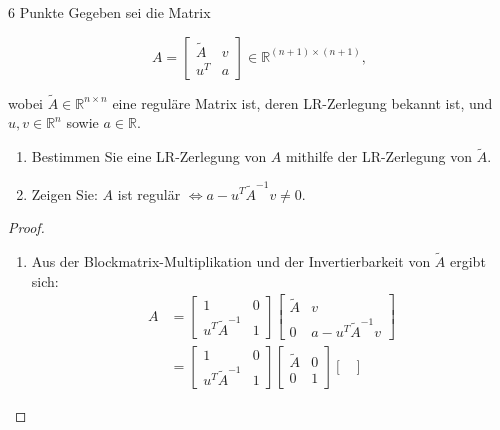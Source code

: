\documentclass{problemset}
\begin{document}
\begin{problem}{6 Punkte}
Gegeben sei die Matrix

\[
    A = \begin{bmatrix} \tilde{A} & v \\ u^T & a \end{bmatrix} \in \mathbb{R}^{(n+1) \times (n+1)},
\]

wobei \(\tilde{A} \in \mathbb{R}^{n \times n}\) eine reguläre Matrix ist, deren
LR-Zerlegung bekannt ist, und \(u, v \in \mathbb{R}^n\) sowie \(a \in
\mathbb{R}\).
\begin{enumerate}
    \item Bestimmen Sie eine LR-Zerlegung von \(A\) mithilfe der LR-Zerlegung
          von \(\tilde{A}\).
    \item Zeigen Sie: \(A\) ist regulär \(\iff a - u^T \tilde{A}^{-1} v \neq
          0\).
\end{enumerate}
\begin{proof}
    \leavevmode
    \begin{enumerate}
        \item \label{problem:5:a} Aus der Blockmatrix-Multiplikation und der
              Invertierbarkeit von \( \tilde{A} \) ergibt sich:
              \begin{align*}
                  A & = \begin{bmatrix}
                            1                  & 0 \\
                            u^T \tilde{A}^{-1} & 1
                        \end{bmatrix}
                  \begin{bmatrix}
                      \tilde{A} & v                        \\
                      0         & a - u^T \tilde{A}^{-1} v
                  \end{bmatrix}                  \\
                    & = \begin{bmatrix}
                            1                  & 0 \\
                            u^T \tilde{A}^{-1} & 1
                        \end{bmatrix}
                  \begin{bmatrix}
                      \tilde{A} & 0 \\
                      0         & 1
                  \end{bmatrix}
                  \begin{bmatrix}

\end{bmatrix}
\end{align*}
\end{enumerate}
\end{proof}
\end{problem}
\end{document}

